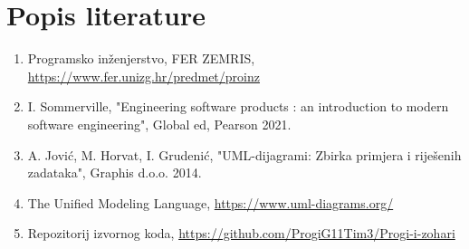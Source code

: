 \chapter*{Popis literature}
		
		
		\begin{enumerate}
			
			
			\item  Programsko inženjerstvo, FER ZEMRIS, \url{https://www.fer.unizg.hr/predmet/proinz}
			
			\item  I. Sommerville, "Engineering software products : an introduction to modern software engineering", Global ed, Pearson 2021.
			
			\item  A. Jović, M. Horvat, I. Grudenić, "UML-dijagrami: Zbirka primjera i riješenih zadataka", Graphis d.o.o. 2014.
			
			\item  The Unified Modeling Language, \url{https://www.uml-diagrams.org/}
			
			\item  Repozitorij izvornog koda, \url{https://github.com/ProgiG11Tim3/Progi-i-zohari}
		\end{enumerate}
		
		 
